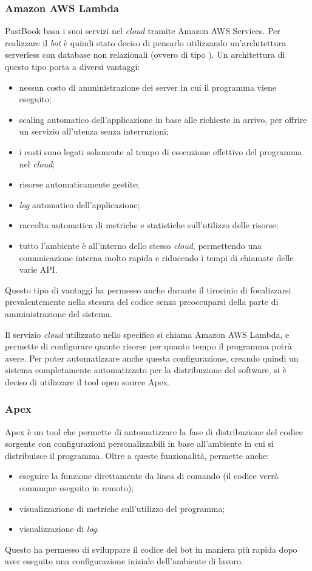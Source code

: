 \subsubsection{Amazon AWS Lambda}
PastBook basa i suoi servizi nel \textit{cloud} tramite Amazon AWS Services. Per
realizzare il \textit{bot} è quindi stato deciso di pensarlo utilizzando
un'architettura serverless con database non relazionali (ovvero di tipo
). Un architettura di questo tipo porta a diversi
vantaggi:

\begin{itemize}

  \item nessun costo di amministrazione dei server in cui il programma viene
eseguito;
  \item scaling automatico dell'applicazione in base alle richieste in arrivo,
per offrire un servizio all'utenza senza interruzioni;
  \item i costi sono legati solamente al tempo di esecuzione effettivo del
programma nel \textit{cloud};
  \item risorse automaticamente gestite;
  \item \textit{log} automatico dell'applicazione;
  \item raccolta automatica di metriche e statistiche sull'utilizzo delle
risorse;
  \item tutto l'ambiente è all'interno dello stesso \textit{cloud}, permettendo
una
comunicazione interna molto rapida e riducendo i tempi di chiamate delle varie
API.
\end{itemize}

Questo tipo di vantaggi ha permesso anche durante il tirocinio di focalizzarsi
prevalentemente nella stesura del codice senza preoccuparsi della parte di
amministrazione del sistema.

Il servizio \textit{cloud} utilizzato nello specifico si chiama Amazon AWS
Lambda, e
permette di configurare quante risorse per quanto tempo il programma potrà
avere. Per poter automatizzare anche questa configurazione, creando quindi un
sistema completamente automatizzato per la distribuzione del software, si è
deciso di utilizzare il tool open source Apex.

\subsubsection{Apex}
Apex è un tool che permette di automatizzare la fase di distribuzione del
codice sorgente con configurazioni personalizzabili in base all'ambiente in cui
si distribuisce il programma. Oltre a queste funzionalità, permette anche:
\begin{itemize}
  \item eseguire la funzione direttamente da linea di comando (il codice verrà
comunque eseguito in remoto);
  \item visualizzazione di metriche sull'utilizzo del programma;
  \item visualizzazione di \textit{log}.
\end{itemize}

Questo ha permesso di sviluppare il codice del bot in maniera più rapida dopo
aver eseguito una configurazione iniziale dell'ambiente di lavoro.
